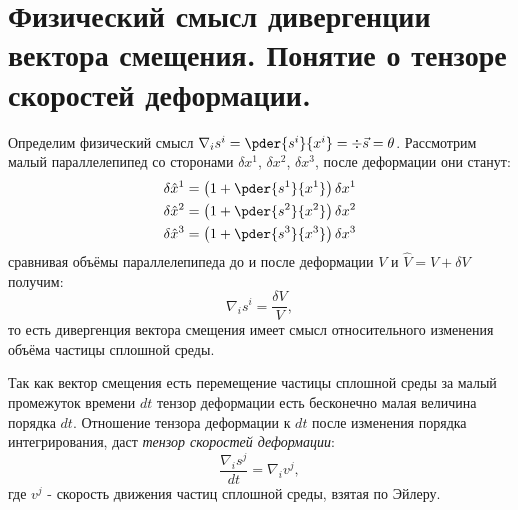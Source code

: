 \chapter{Физический смысл дивергенции вектора смещения. Понятие о тензоре
скоростей деформации.}
Определим физический смысл \( \nabla_is^i = \pder{s^i}{x^i} = \div\vec{s} =
\theta \). Рассмотрим малый параллелепипед со сторонами \( \delta x^1 \),
\( \delta x^2 \), \( \delta x^3 \), после деформации они станут:
\begin{gather*}
	\delta\hat{x}^1 = \left(1 + \pder{s^1}{x^1}\right)\delta x^1\\
	\delta\hat{x}^2 = \left(1 + \pder{s^2}{x^2}\right)\delta x^2\\
	\delta\hat{x}^3 = \left(1 + \pder{s^3}{x^3}\right)\delta x^3
\end{gather*}
сравнивая объёмы параллелепипеда до и после деформации \( V \) и
\( \hat{V} = V + \delta V \) получим:
\[
	\nabla_is^i = \frac{\delta V}{V},
\]
то есть дивергенция вектора смещения имеет смысл относительного изменения
объёма частицы сплошной среды.

Так как вектор смещения есть перемещение частицы сплошной среды за малый
промежуток времени \( dt \) тензор деформации есть бесконечно малая величина
порядка \( dt \). Отношение тензора деформации к \( dt \) после изменения
порядка интегрирования, даст \emph{тензор скоростей деформации}:
\[
	\frac{\nabla_is^j}{dt} = \nabla_iv^j,
\]
где \( v^j \) - скорость движения частиц сплошной среды, взятая по Эйлеру.
\newpage
